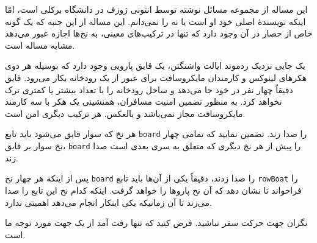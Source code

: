 \documentclass{book}
\begin{document}
    این مساله از مجموعه مسائل نوشته توسط انتونی ژوزف در دانشگاه برکلی
    است، امّا اینکه نویسندهٔ اصلی خود او است یا نه را نمی‌دانم. این مساله از این جنبه که یک گونه خاص از حصار در آن وجود دارد که تنها در ترکیب‌های 
    معینی، به نخ‌ها اجازه عبور می‌دهد مشابه مساله  است. 

    یک جایی نزدیک ردموند ایالت واشنگتن، یک قایق پارویی وجود دارد که بوسیله هر دوی هکرهای لینوکس و 
    کارمندان مایکروسافت برای عبور از یک رودخانه بکار می‌رود.  قایق دقیقاً چهار نفر در خود جا می‌دهد و ساحل رودخانه را با تعداد بیشتر یا کمتری ترک نخواهد کرد. 
    به منظور تضمین امنیت مسافران، همنشینی یک هکر با سه کارمند مایکروسافت مجاز نمی‌باشد و بالعکس. هر ترکیب دیگری امن است. 

    هر نخ که سوار قایق می‌شود باید تابع  {\tt board} را صدا زند. تضمین نمایید که تمامی چهار نخ سوار بر قایق،  {\tt board} را 
    پیش از هر نخ دیگری که متعلق به سری بعدی است صدا زند. 
    

    پس از اینکه هر چهار نخ  {\tt board} را صدا زدند، دقیقاً یکی از آن‌ها باید تابع {\tt rowBoat} را فراخواند تا نشان دهد که آن نخ 
    پاروها را خواهد گرفت. اینکه کدام نخ این تابع را صدا می‌زند تا آن زمانیکه یکی اینکار انجام می‌دهد اهمیتی ندارد. 

    نگران جهت حرکت سفر نباشید. فرض کنید که تنها رفت آمد از یک جهت مورد توجه ما است. 
\end{document}
